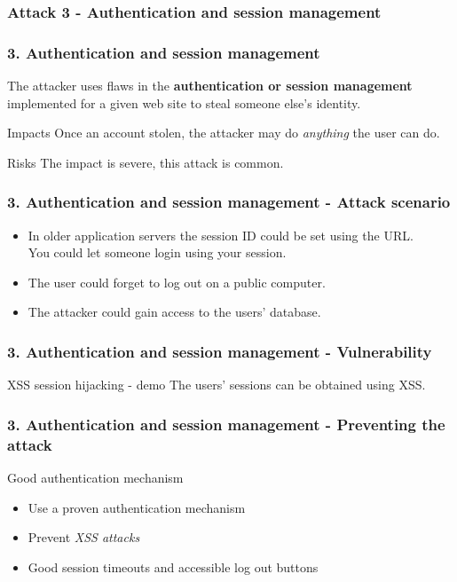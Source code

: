 \subsubsection{Attack 3 - Authentication and session management}

\begin{frame}
\frametitle{3. Authentication and session management}
The attacker uses flaws in the \textbf{authentication or session management}
implemented for a given web site to steal someone else's identity.
\begin{block}{Impacts}
Once an account stolen, the attacker may do \emph{anything} the user
can do. %
\end{block}
\begin{block}{Risks}
The impact is \alert{severe}, this attack is common.
\end{block}
\end{frame}

\begin{frame}
\frametitle{3. Authentication and session management - Attack scenario}
\begin{itemize}
\item In older application servers the session ID could be set using the URL.
	\\ You could let someone login using your session.
\item The user could forget to log out on a public computer.
\item The attacker could gain access to the users' database.
\end{itemize}
\end{frame}

\begin{frame}
\frametitle{3. Authentication and session management - Vulnerability}
\begin{exampleblock}{XSS session hijacking - demo}
The users' sessions can be obtained using XSS.
\end{exampleblock}
\end{frame}

\begin{frame}
\frametitle{3. Authentication and session management - Preventing the attack}
\begin{block}{Good authentication mechanism}
\begin{itemize}
\item Use a proven authentication mechanism
\item Prevent \emph{XSS attacks}
\item Good session timeouts and accessible log out buttons
\end{itemize}
\end{block}
\end{frame}


